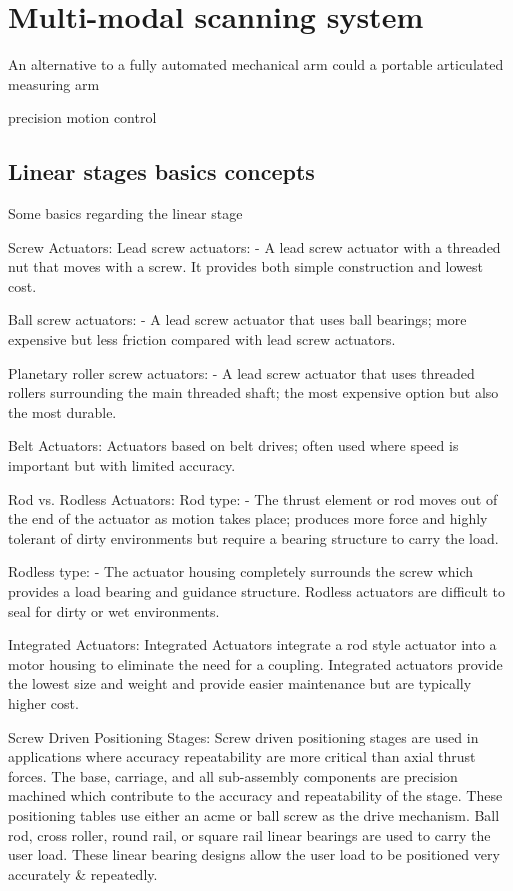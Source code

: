 \chapter{Multi-modal scanning system}

An alternative to a fully automated mechanical arm could  a portable articulated measuring arm

precision motion control
\section{Linear stages basics concepts}
Some basics regarding the linear stage


Screw Actuators:
Lead screw actuators: - A lead screw actuator with a threaded nut that moves with a screw. It provides both simple construction and lowest cost.

Ball screw actuators: - A lead screw actuator that uses ball bearings; more expensive but less friction compared with lead screw actuators.

Planetary roller screw actuators: - A lead screw actuator that uses threaded rollers surrounding the main threaded shaft; the most expensive option but also the most durable.

Belt Actuators:
Actuators based on belt drives; often used where speed is important but with limited accuracy.

Rod vs. Rodless Actuators:
Rod type: - The thrust element or rod moves out of the end of the actuator as motion takes place; produces more force and highly tolerant of dirty environments but require a bearing structure to carry the load.

Rodless type: - The actuator housing completely surrounds the screw which provides a load bearing and guidance structure. Rodless actuators are difficult to seal for dirty or wet environments.

Integrated Actuators:
Integrated Actuators integrate a rod style actuator into a motor housing to eliminate the need for a coupling. Integrated actuators provide the lowest size and weight and provide easier maintenance but are typically higher cost.

Screw Driven Positioning Stages:
Screw driven positioning stages are used in applications where accuracy  repeatability are more critical than axial thrust forces. The base, carriage, and all sub-assembly components are precision machined which contribute to the accuracy and repeatability of the stage. These positioning tables use either an acme or ball screw as the drive mechanism. Ball  rod, cross roller, round rail, or square rail linear bearings are used to carry the user load. These linear bearing designs allow the user load to be positioned very accurately & repeatedly.

